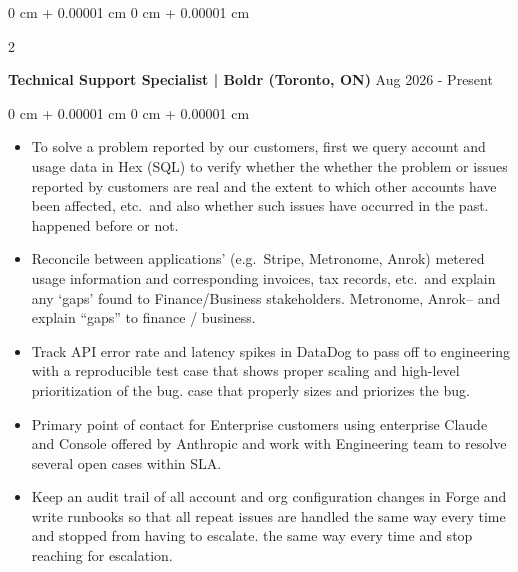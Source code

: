 \documentclass[10pt, letterpaper]{article}
\newenvironment{highlights}{
    \begin{itemize}[
        topsep=0.10 cm,
        parsep=0.10 cm,
        partopsep=0pt,
        itemsep=0pt,
        leftmargin=0 cm + 10pt
    ]
}{
    \end{itemize}
} %
\newenvironment{onecolentry}{
    \begin{adjustwidth}{
        0 cm + 0.00001 cm
    }{
        0 cm + 0.00001 cm
    }
}{
    \end{adjustwidth}
} %
\newenvironment{twocolentry}[2][]{
    \onecolentry
    \def\secondColumn{#2}
    \setcolumnwidth{\fill, 4.5 cm}
    \begin{paracol}{2}
}{
    \switchcolumn \raggedleft \secondColumn
    \end{paracol}
    \endonecolentry
} %
\begin{document}
        \begin{twocolentry}{
            {Aug 2026 - Present}
        }
            \textbf{Technical Support Specialist | Boldr (Toronto, ON)}\end{twocolentry}
        \vspace{0.10 cm}
        \begin{onecolentry}
            \begin{highlights}
                \item To solve a problem reported by our customers, first we query account and usage data in Hex (SQL) to verify whether the whether the problem or issues reported by customers are real and the extent to which other accounts have been affected, etc.\ and also whether such issues have occurred in the past. happened before or not.
                \item Reconcile between applications’ (e.g.\ Stripe, Metronome, Anrok) metered usage information and corresponding invoices, tax records, etc.\ and explain any ‘gaps’ found to Finance/Business stakeholders. Metronome, Anrok– and explain “gaps” to finance / business.
                \item Track API error rate and latency spikes in DataDog to pass off to engineering with a reproducible test case that shows proper scaling and high-level prioritization of the bug. case that properly sizes and priorizes the bug.
                \item Primary point of contact for Enterprise customers using enterprise Claude and Console offered by Anthropic and work with Engineering team to resolve several open cases within SLA.
                \item Keep an audit trail of all account and org configuration changes in Forge and write runbooks so that all repeat issues are handled the same way every time and stopped from having to escalate. the same way every time and stop reaching for escalation.
            \end{highlights}
        \end{onecolentry}
\end{document}
